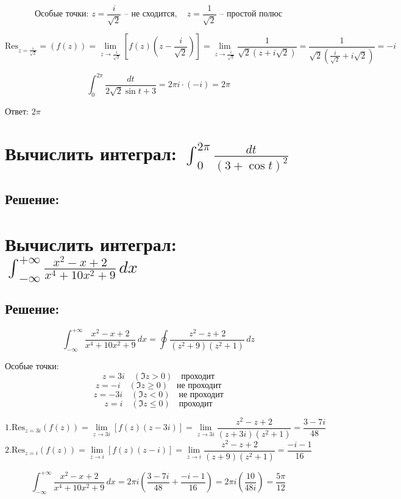 \documentclass{article}
\begin{document}
\[
\text{Особые точки: } z = \frac{i}{\sqrt{2}} \text{ -- не сходится}, \quad z = \frac{1}{\sqrt{2}} \text{ -- простой полюс}
\]

\[
\text{Res}_{z = \frac{i}{\sqrt{2}} } =  \left( f(z) \right) =\lim_{z \to \frac{i}{\sqrt{2}}}\left[f(z)\left(z - \frac{i}{\sqrt{2}}\right)\right] = \lim_{z \to \frac{i}{\sqrt{2}}} \frac{1}{\sqrt{2} (z + i \sqrt{2})} = \frac{1}{\sqrt{2}\left(\frac{i}{\sqrt{2}} + i\sqrt{2}\right)} = -i
\]

\[
\int_{0}^{2\pi} \frac{dt}{2\sqrt{2} \sin t + 3} = 2\pi i \cdot (-i) = 2\pi
\]

Ответ:  $2\pi$

\section{Вычислить интеграл: $\int_{0}^{2\pi} \frac{dt}{(3 + \cos t)^2}$}
\subsection{Решение:}

\section{Вычислить интеграл: $\int_{-\infty}^{+\infty} \frac{x^2 - x + 2}{x^4 + 10x^2 + 9} \, dx$}
\subsection{Решение:}
\[
\int_{-\infty}^{+\infty} \frac{x^2 - x + 2}{x^4 + 10x^2 + 9} \, dx = \oint \frac{z^2 - z + 2}{(z^2 + 9)(z^2 + 1)} \, dz
\]

Особые точки:
\[
z = 3i \quad (\Im z > 0) \quad \text{проходит}
\]
\[
z = -i \quad (\Im z \geq 0) \quad \text{не проходит}
\]
\[
z = -3i \quad (\Im z < 0) \quad \text{не проходит}
\]
\[
z = i \quad (\Im z \leq 0) \quad \text{проходит}
\]


\[
1. \text{Res}_{z = 3i}(f(z)) = \lim_{z \to 3i}\left[f(z)\left(z - 3i\right)\right] = \lim_{z \to 3i} \frac{z^2 - z + 2}{(z + 3i)(z^2 + 1)} = \frac{3 - 7i}{48} 
\]
\[
2. \text{Res}_{z = i}(f(z)) =  \lim_{z \to i}\left[f(z)\left(z - i\right)\right] =\lim_{z \to i} \frac{z^2 - z + 2}{(z + 9)(z^2 + 1)}  = \frac{-i - 1}{16}
\]

\[
\int_{-\infty}^{+\infty} \frac{x^2 - x + 2}{x^4 + 10x^2 + 9} \, dx = 2\pi i \left( \frac{3 - 7i}{48}  + \frac{-i - 1}{16} \right) = 2\pi i(\frac{10}{48i}) = \frac{5\pi}{12}
\]
\end{document}
